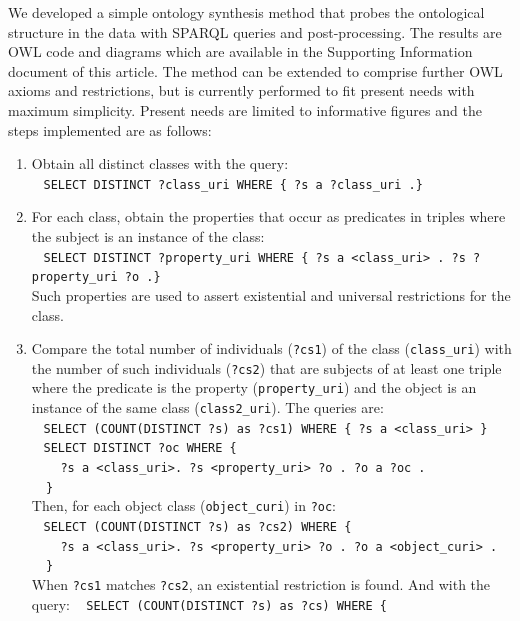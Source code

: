 \documentclass[journal,article,submit,moreauthors,pdftex]{Definitions/mdpi}
\newcommand{\textttt}[1] {\texttt{\footnotesize#1}}
\newcommand{\h} {\hphantom ~ }
\begin{document}
We developed a simple ontology synthesis method that probes
the ontological structure in the data with
SPARQL queries and post-processing.
The results are OWL code and diagrams which are available in the
Supporting Information document of this article.
The method can be extended to comprise further OWL axioms and restrictions,
but is currently performed to fit present needs with maximum simplicity.
Present needs are limited to informative figures and
the steps implemented are as follows:
\begin{enumerate}[leftmargin=0cm]
    \item Obtain all distinct classes with the query:\\
        \h\textttt{SELECT DISTINCT ?class\_uri WHERE \{ ?s a ?class\_uri .\}}
\item For each class, obtain the properties that occur as predicates in triples where the subject is an instance of the class:\\
	\h\textttt{SELECT DISTINCT ?property\_uri WHERE \{ ?s a <class\_uri> . ?s ?property\_uri ?o .\}}\\
Such properties are used to assert existential and universal restrictions for the class.
\item Compare the total number of individuals (\textttt{?cs1}) of the class (\textttt{class\_uri}) with
	the number of such individuals (\textttt{?cs2}) that are subjects of at least one triple where 
        the predicate is the property (\textttt{property\_uri}) and the object is
        an instance of the same class (\textttt{class2\_uri}).
	The queries are:\\
	\h\textttt{SELECT (COUNT(DISTINCT ?s) as ?cs1) WHERE \{ ?s a <class\_uri> \}}\\
        \h\textttt{SELECT DISTINCT ?oc WHERE \{\\
	\h\h ?s a <class\_uri>. ?s <property\_uri> ?o . ?o a ?oc . \\ 
        \h\}}\\
        Then, for each object class (\textttt{object\_curi}) in \textttt{?oc}:\\
	\h\textttt{SELECT (COUNT(DISTINCT ?s) as ?cs2) WHERE \{\\
	\h\h ?s a <class\_uri>. ?s <property\_uri> ?o . ?o a <object\_curi> .\\         \h\}}\\
        When \textttt{?cs1} matches \textttt{?cs2}, an existential restriction is found. And with the query:
	\h\textttt{SELECT (COUNT(DISTINCT ?s) as ?cs) WHERE \{\\
}
\end{enumerate}
\end{document}
